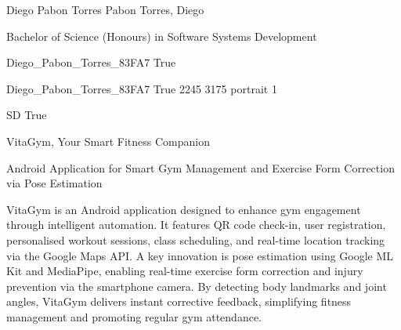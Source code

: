 
\begingroup{}\relax



\def\Key{Diego_Pabon_Torres_83FA7}

{Diego Pabon Torres}
{Pabon Torres, Diego}

{Bachelor of Science (Honours) in Software Systems Development}

{Diego_Pabon_Torres_83FA7}
{True}

{Diego_Pabon_Torres_83FA7}
{True}
{2245}
{3175}
{portrait}
{1}

{SD}
{True}

{VitaGym, Your Smart Fitness Companion}

{Android Application for Smart Gym Management and Exercise Form Correction via Pose Estimation}

{VitaGym is an Android application designed to enhance gym engagement through intelligent automation. It features QR code check-in, user registration, personalised workout sessions, class scheduling, and real-time location tracking via the Google Maps API. A key innovation is pose estimation using Google ML Kit and MediaPipe, enabling real-time exercise form correction and injury prevention via the smartphone camera. By detecting body landmarks and joint angles, VitaGym delivers instant corrective feedback, simplifying fitness management and promoting regular gym attendance.}

